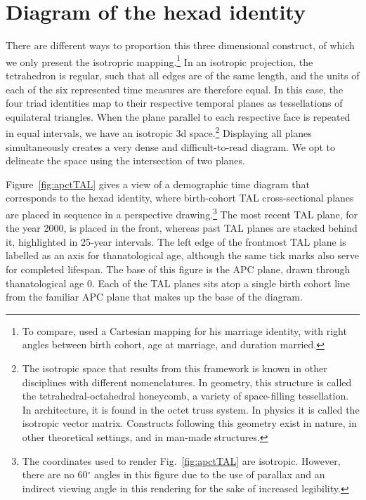 \documentclass[12pt,oneside,a4paper]{article} %
\theoremstyle{definition}
\begin{document}
 \section{Diagram of the hexad identity}
 \label{sec:diagram}
 There are different ways to proportion this three dimensional construct,
of which we only present the isotropric mapping.\footnote{To compare,
\citet{lexis1875einleitung} used a Cartesian mapping for his marriage identity,
with right angles between birth cohort, age at marriage, and duration married.}
In an isotropic projection, the tetrahedron is regular, such that all edges are
of the same length, and the units of each of the six represented time measures
are therefore equal. In this case, the four triad identities map to
their respective temporal planes as tessellations of equilateral triangles. When
the plane parallel to each respective face is repeated in equal intervals, we have an isotropic 3d space.\footnote{The isotropic space that results from this framework is known in other disciplines with different nomenclatures. In geometry, this structure is called the
tetrahedral-octahedral honeycomb, a variety of space-filling tessellation. In
architecture, it is found in the octet truss system. In physics it is called
the isotropic vector matrix. Constructs following this geometry exist in nature,
in other theoretical settings, and in man-made structures.}
Displaying all planes simultaneously creates a very dense and difficult-to-read
diagram. We opt to delineate the space using the intersection of two planes.

Figure~\ref{fig:apctTAL} gives a view of a demographic
time diagram that corresponds to the hexad identity, where birth-cohort TAL
cross-sectional planes are placed in sequence in a perspective drawing.\footnote{The coordinates used to render Fig.~\ref{fig:apctTAL} are isotropic.
However, there are no 60$^\circ$ angles in this figure due to the use of
parallax and an indirect viewing angle in this rendering for the sake of
increased legibility.} The most recent TAL plane, for the year 2000, is placed
in the front, whereas past TAL planes are stacked behind it, highlighted in
25-year intervals. The left edge of the frontmost TAL plane is labelled as an
axis for thanatological age, although the same tick marks also serve for
completed lifespan.
The base of this figure is the APC plane, drawn through thanatological age 0.
Each of the TAL planes sits atop a single birth cohort line from the familiar
APC plane that makes up the base of the diagram.
\end{document}
